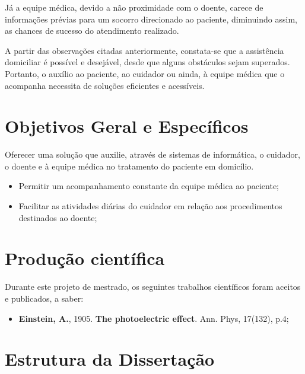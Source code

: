 Já a equipe médica, devido a não proximidade com o doente, carece de informações
prévias para um socorro direcionado ao paciente, diminuindo assim, as chances de
sucesso do atendimento realizado.


A partir das observações citadas anteriormente, constata-se que a assistência
domiciliar é possível e desejável, desde que alguns obstáculos sejam superados.
Portanto, o auxílio ao paciente, ao cuidador ou ainda, à equipe médica que o
acompanha necessita de soluções eficientes e acessíveis.

\section{Objetivos Geral e Específicos}\label{sec:objetivos}

Oferecer uma solução que auxilie, através de sistemas de informática, o 
cuidador, o doente e à equipe médica no tratamento do paciente em domicílio.


\begin{itemize}
  \item Permitir um acompanhamento constante da equipe médica ao paciente;
  \item Facilitar as atividades diárias do cuidador em relação aos procedimentos
  destinados ao doente;
\end{itemize}

\section{Produção científica}\label{sec:producao}  

Durante este projeto de mestrado, os seguintes trabalhos científicos foram
aceitos e publicados, a saber:

\begin{itemize}
	\item \textbf{Einstein, A.}, 1905. \textbf{The photoelectric effect}. Ann. Phys, 17(132), p.4;
\end{itemize}

\section{Estrutura da Dissertação}\label{sec:estrutura}
\lipsum[1]
